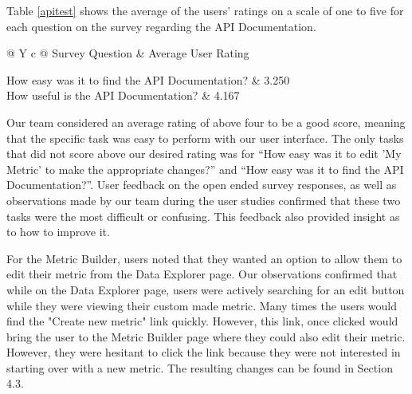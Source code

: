 		Table \ref{apitest} shows the average of the users' ratings on a scale of one to five for each question on the survey regarding the API Documentation.
			
			\begin{table}[t]
				\centering
				\begin{tabularx}{\textwidth}{@{} Y c @{}} %
					\toprule
					Survey Question																& Average User Rating	\\
					\midrule
					
					How easy was it to find the API Documentation?								& 3.250					\\
					How useful is the API Documentation?										& 4.167					\\
					
					\bottomrule
				\end{tabularx}
				\caption{Average ratings for the user study on the API Documentation}
				\label{apitest}
			\end{table}	
		
		Our team considered an average rating of above four to be a good score, 
		meaning that the specific task was easy to perform with our user interface.
		The only tasks that did not score above our desired rating was for 
		“How easy was it to edit 'My Metric' to make the appropriate changes?” 
		and “How easy was it to find the API Documentation?”. User feedback on the 
		open ended survey responses, as well as observations made by our team during 
		the user studies confirmed that these two tasks were the most 
		difficult or confusing. This feedback also provided insight as to how to improve it.
		
		For the Metric Builder, users noted that they wanted an option to 
		allow them to edit their metric from the Data Explorer page. 
		Our observations confirmed that while on the Data Explorer page, 
		users were actively searching for an edit button while they were 
		viewing their custom made metric. Many times the users would find the 
		"Create new metric" link quickly. However, this link, once clicked would bring the 
		user to the Metric Builder page where they could also edit their metric. 
		However, they were hesitant to click the link because they were not 
		interested in starting over with a new metric. The resulting changes can be found in Section 4.3.
		
